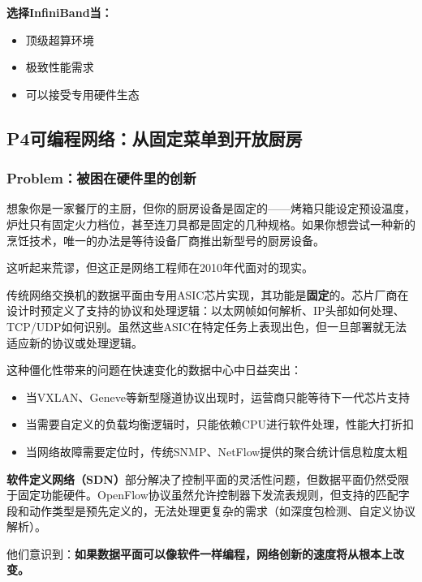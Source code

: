 \textbf{选择InfiniBand当：}
\begin{itemize}
    \item 顶级超算环境
    \item 极致性能需求
    \item 可以接受专用硬件生态
\end{itemize}

\subsection{P4可编程网络：从固定菜单到开放厨房}

\subsubsection{Problem：被困在硬件里的创新}

想象你是一家餐厅的主厨，但你的厨房设备是固定的——烤箱只能设定预设温度，炉灶只有固定火力档位，甚至连刀具都是固定的几种规格。如果你想尝试一种新的烹饪技术，唯一的办法是等待设备厂商推出新型号的厨房设备。

这听起来荒谬，但这正是网络工程师在2010年代面对的现实。

传统网络交换机的数据平面由专用ASIC芯片实现，其功能是\textbf{固定}的。芯片厂商在设计时预定义了支持的协议和处理逻辑：以太网帧如何解析、IP头部如何处理、TCP/UDP如何识别。虽然这些ASIC在特定任务上表现出色，但一旦部署就无法适应新的协议或处理逻辑。

这种僵化性带来的问题在快速变化的数据中心中日益突出：

\begin{itemize}
    \item 当VXLAN、Geneve等新型隧道协议出现时，运营商只能等待下一代芯片支持
    \item 当需要自定义的负载均衡逻辑时，只能依赖CPU进行软件处理，性能大打折扣
    \item 当网络故障需要定位时，传统SNMP、NetFlow提供的聚合统计信息粒度太粗
\end{itemize}

\textbf{软件定义网络（SDN）}部分解决了控制平面的灵活性问题，但数据平面仍然受限于固定功能硬件。OpenFlow协议虽然允许控制器下发流表规则，但支持的匹配字段和动作类型是预先定义的，无法处理更复杂的需求（如深度包检测、自定义协议解析）。

他们意识到：\textbf{如果数据平面可以像软件一样编程，网络创新的速度将从根本上改变。}

